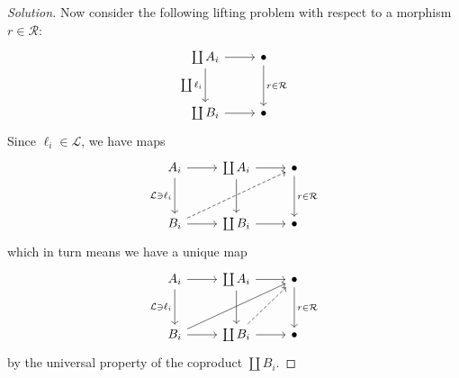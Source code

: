 \documentclass{article}
\numberwithin{equation}{section}
\newcommand{\Lc}{\mathcal{L}}
\newcommand{\Rc}{\mathcal{R}}
\begin{document}
\begin{proof}[Solution]
	Now consider the following lifting problem with respect to a morphism $r\in\Rc$:
	\[\begin{tikzcd}[row sep=large]
		\coprod A_i\arrow[d,swap,"\coprod\ell_i"]\arrow[r]&\bullet\arrow[d,"r\in\Rc"]\\
		\coprod B_i\arrow[r]&\bullet
	\end{tikzcd}\]
	Since $\ell_i\in\Lc$, we have maps
	\[\begin{tikzcd}[row sep=large]
		A_i\arrow[r]\arrow[d,"\Lc\ni\ell_i",swap]&\coprod A_i\arrow[d]\arrow[r]&\bullet\arrow[d,"r\in\Rc"]\\
		B_i\arrow[r]\arrow[rru,dashed]&\coprod B_i\arrow[r]&\bullet
	\end{tikzcd}\]
	which in turn means we have a unique map
	\[\begin{tikzcd}[row sep=large]
		A_i\arrow[r]\arrow[d,"\Lc\ni\ell_i",swap]&\coprod A_i\arrow[d]\arrow[r]&\bullet\arrow[d,"r\in\Rc"]\\
		B_i\arrow[r]\arrow[rru]&\coprod B_i\arrow[r]\arrow[ur,dashed]&\bullet
	\end{tikzcd}\]
	by the universal property of the coproduct $\coprod B_i$.
	

\end{proof}
\end{document}
